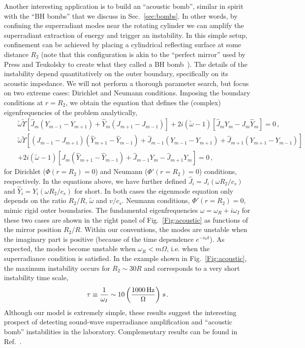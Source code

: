 \documentclass[11pt]{article}
\newcommand{\nn}{\nonumber}
\numberwithin{equation}{section} %
\begin{document}
Another interesting application is to build an ``acoustic bomb'', similar in spirit with the ``BH bombs'' that we discuss in Sec.~\ref{sec:bombs}. In other words, by confining the superradiant modes near the rotating cylinder we can amplify the superradiant extraction of energy and trigger an instability. In this simple setup, confinement can be achieved by placing a cylindrical reflecting surface at some distance $R_2$ (note that this configuration is akin to the ``perfect mirror'' used by Press and Teukolsky to create what they called a BH bomb~\cite{Press:1972zz}). The details of the instability depend quantitatively on the outer boundary, specifically on its acoustic impedance. We will not perform a thorough parameter search, but focus on two extreme cases: Dirichlet and Neumann conditions.
Imposing the boundary conditions at $r=R_2$, we obtain the equation that defines the (complex) eigenfrequencies of the problem analytically,
\begin{eqnarray}
&&\tilde{\omega} \tilde{\Upsilon}\left[\hat{J}_m (Y_{m-1}-Y_{m+1})+ \hat{Y}_m (J_{m+1}- J_{m-1})\right]+2 i (\tilde{\omega}-1) \left[\hat{J}_m Y_m- J_m \hat{Y}_m \right]=0\,,\\
&&\tilde{\omega} \tilde{\Upsilon} \left[\left(J_{m-1}-J_{m+1}\right) \left(\hat{Y}_{m+1}-\hat{Y}_{m-1}\right)+\hat{J}_{m-1} \left(Y_{m-1}-Y_{m+1}\right)+\hat{J}_{m+1} \left(Y_{m+1}-Y_{m-1}\right)\right]\nn\\
&&+2i (\tilde{\omega}-1) \left[J_m \left(\hat{Y}_{m+1}-\hat{Y}_{m-1}\right)+\hat{J}_{m-1} Y_m-\hat{J}_{m+1} Y_m\right]=0\,,
\end{eqnarray}
for Dirichlet ($\Phi(r=R_2)=0$) and Neumann ($\Phi'(r=R_2)=0$) conditions, respectively. In the equations above, we have further defined $\hat{J}_i=J_i(\omega R_2/c_s)$ and $\hat{Y}_i=Y_i(\omega R_2/c_s)$ for short. In both cases the eigenmode equation only depends on the ratio $R_2/R$, $\tilde{\omega}$ and $v/c_s$. 
Neumann conditions, $\Phi'(r=R_2)=0$, mimic rigid outer boundaries. The fundamental eigenfrequencies $\omega=\omega_R+i\omega_I$ for these two cases are shown in the right panel of Fig.~\ref{Fig:acoustic} as functions of the mirror position $R_2/R$. Within our conventions, the modes are unstable when the imaginary part is positive (because of the time dependence $e^{-i\omega t}$). As expected, the modes become unstable when $\omega_R<m\Omega$, i.e. when the superradiance condition is satisfied. In the example shown in Fig.~\ref{Fig:acoustic}, the maximum instability occurs for $R_2\sim 30 R$ and corresponds to a very short instability time scale, 
\begin{equation}
 \tau\equiv\frac{1}{\omega_I}\sim 10\left(\frac{1000\,{\rm Hz}}{\Omega}\right)\,{\rm s}\,.
\end{equation}
%
Although our model is extremely simple, these results suggest the interesting prospect of detecting sound-wave superradiance amplification and ``acoustic bomb'' instabilities in the laboratory.
Complementary results can be found in Ref.~\cite{Cardoso:2016zvz}.
\end{document}
